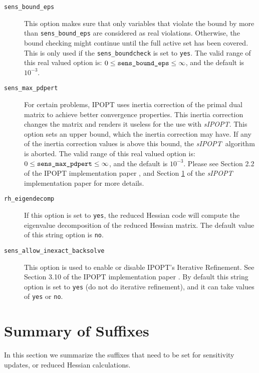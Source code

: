 \documentclass[letter, 11pt]{article}
\newcommand{\sensKKT}{\emph{sIPOPT}}
\newcommand{\boundcheckopt}{sens\_boundcheck}
\newcommand{\boundepsopt}{sens\_bound\_eps}
\newcommand{\maxpdpertopt}{sens\_max\_pdpert}
\newcommand{\eigendecompopt}{rh\_eigendecomp}
\newcommand{\allowinex}{sens\_allow\_inexact\_backsolve}
\begin{document}
\begin{description}
\item[\texttt{\boundepsopt}]  This option makes sure that only variables that violate the bound by more than {\texttt{\boundepsopt}}
   are considered as real violations. Otherwise, the bound checking might continue until the full active set has been covered.
   This is only used if the \texttt{\boundcheckopt} is set to \texttt{yes}. The valid range of this real valued option is:
   $0 \leq \mbox{\texttt{\boundepsopt}} \leq \infty$, and the default is $10^{-3}$.

\item[\texttt{\maxpdpertopt}] For certain problems, IPOPT uses inertia correction of the primal dual matrix to achieve better convergence properties. This inertia correction changes the matrix and renders it useless for the use with \sensKKT. This option sets an upper bound, which the inertia correction may have. If any of the inertia correction values is above this bound, the \sensKKT\  algorithm is aborted. The valid range of this real valued option is: $0 \leq \mbox{\texttt{\maxpdpertopt}} \leq \infty$, and the default is $10^{-3}$. Please see Section 2.2 of the IPOPT implementation paper \cite{Waechter2006}, and Section \ref{} of the {\sensKKT} implementation paper \cite{pirnay:2011} for more details.

\item[\texttt{\eigendecompopt}] If this option is set to \texttt{yes}, the reduced Hessian code will compute the eigenvalue decomposition of the reduced Hessian matrix. The default value of this string option is \texttt{no}.

\item[\texttt{\allowinex}] This option is used to enable or disable  IPOPT's Iterative Refinement. See Section 3.10 of the IPOPT implementation paper \cite{Waechter2006}. By default this string option is set to \texttt{yes} (do not do iterative refinement), and it can take values of \texttt{yes} or \texttt{no}.

\end{description}



\appendix
\section{Summary of Suffixes}

In this section we summarize the suffixes that need to be set for sensitivity updates, or reduced Hessian calculations.
\end{document}
